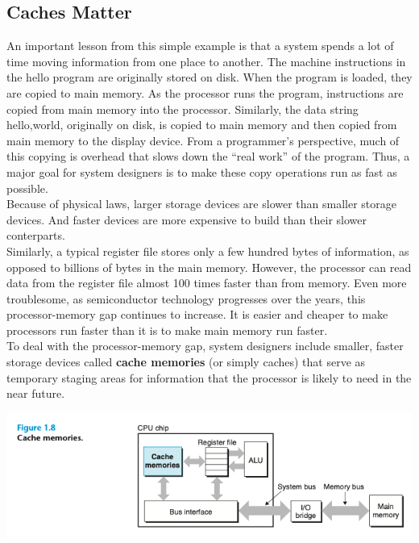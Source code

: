 \documentclass[11pt]{article}
\begin{document}
\subsection{Caches Matter}
\label{sec:orgb62dcf5}
An important lesson from this simple example is that a system spends a lot of time moving information from one place to another. The machine instructions in the hello program are originally stored on disk. When the program is loaded, they are copied to main memory. As the processor runs the program, instructions are copied from main memory into the processor. Similarly, the data string hello,world\n, originally on disk, is copied to main memory and then copied from main memory to the display device. From a programmer’s perspective, much of this copying is overhead that slows down the “real work” of the program. Thus, a major goal for system designers is to make these copy operations run as fast as possible.\\

Because of physical laws, larger storage devices are slower than smaller storage devices. And faster devices are more expensive to build than their slower conterparts.\\

Similarly, a typical register file stores only a few hundred bytes of information, as opposed to billions of bytes in the main memory. However, the processor can read data from the register file almost 100 times faster than from memory. Even more troublesome, as semiconductor technology progresses over the years, this processor-memory gap continues to increase. It is easier and cheaper to make processors run faster than it is to make main memory run faster.\\

To deal with the processor-memory gap, system designers include smaller, faster storage devices called \textbf{cache memories} (or simply caches) that serve as temporary staging areas for information that the processor is likely to need in the near future.\\

\begin{center}
\includegraphics[width=.9\linewidth]{pics/cache-memories.png}
\end{center}
\end{document}
